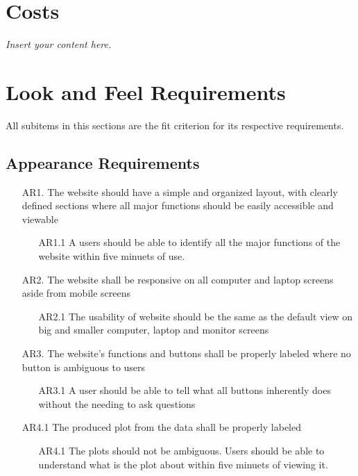 \documentclass[12pt]{article}
\newcommand{\lips}{\textit{Insert your content here.}}
\begin{document}
\section{Costs}
\lips
\section{Look and Feel Requirements}
All subitems in this sections are the fit criterion for its respective
requirements. 
\subsection{Appearance Requirements}
\begin{itemize}
  \item [AR1.]The website should have a simple and organized layout, with
  clearly defined sections where all major functions should be easily accessible
  and viewable 
  \begin{itemize}
    \item[AR1.1] A users should be able to identify all the major functions of
    the website within five minuets of use.
  \end{itemize}
  \item [AR2.] The website shall be responsive on all computer and laptop
  screens aside from mobile screens
  \begin{itemize}
    \item [AR2.1] The usability of website should be the same as the default
    view on big and smaller computer, laptop and monitor screens
  \end{itemize}
  \item [AR3.] The website's functions and buttons shall be properly labeled
  where no button is ambiguous to users 
  \begin{itemize}
    \item [AR3.1] A user should be able to tell what all buttons inherently does
    without the needing to ask questions
  \end{itemize}
  \item [AR4.1]The produced plot from the data shall be properly labeled
  \begin{itemize}
    \item [AR4.1] The plots should not be ambiguous. Users should be able to
    understand what is the plot about within five minuets of viewing it.
  \end{itemize}
  \subitem
\end{itemize}
\end{document}
